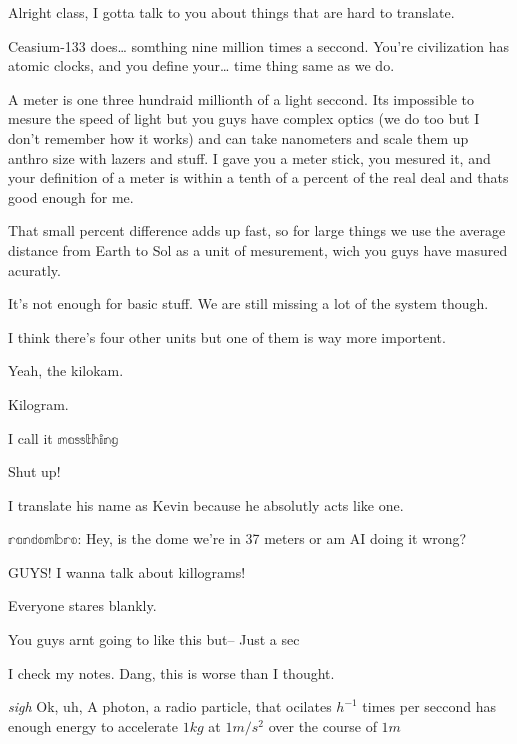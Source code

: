 


\gr Alright class, I gotta talk to you about things that are hard to translate.

\gr Ceasium-133 does\ldots{} somthing nine million times a seccond. You're civilization has atomic clocks, and you define your\ldots{} time thing same as we do.

\gr A meter is one three hundraid millionth of a light seccond. Its impossible to mesure the speed of light but you guys have complex optics (we do too but I don't remember how it works) and can take nanometers and scale them up anthro size with lazers and stuff. I gave you a meter stick, you mesured it, and your definition of a meter is within a tenth of a percent of the real deal and thats good enough for me.

\gr That small percent difference adds up fast, so for large things we use the average distance from Earth to Sol as a unit of mesurement, wich you guys have masured acuratly.

\tek It's not enough for basic stuff. We are still missing a lot of the system though.

\gr I think there's four other units but one of them is way more importent.

\tek Yeah, the kilokam.

\gr Kilogram.

\kev I call it $\mathbb{massthing}$ %

\ker Shut up!

I translate his name as Kevin because he absolutly acts like one.

\noindent$\mathbb{randombro}$: Hey, is the dome we're in 37 meters or am AI doing it wrong?

\gr GUYS! I wanna talk about killograms!

Everyone stares blankly.

\gr You guys arnt going to like this but-- Just a sec

I check my notes. Dang, this is worse than I thought.

\gr \emph{sigh} Ok, uh, A photon, a radio particle, that ocilates $h^{-1}$ times per seccond has enough energy to accelerate $1kg$ at $1m/s^2$ over the course of $1m$

